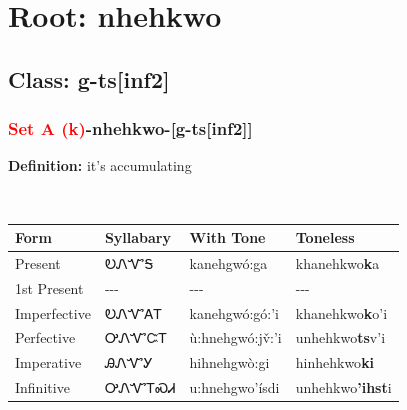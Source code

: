 \needspace{4in}
\section*{Root: nhehkwo}
\nopagebreak
{}
\needspace{3in}
\subsection*{Class: g-ts[inf2]}
\nopagebreak
\needspace{2in}
\subsubsection*{\textcolor{Red}{Set A (k)}{-}\textbf{nhehkwo}{-}[g-ts[inf2]]}
\nopagebreak
\textbf{Definition: } it{\textquoteright}s accumulating
\\[0.5em]
\begin{tabularx}{\textwidth}{l X X X}%
\toprule%
\textbf{Form}&\textbf{Syllabary}&\textbf{With Tone}&\textbf{Toneless}\\%
\midrule%
Present&ᎧᏁᏉᎦ&kanehgwó:ga&khanehkwo\textbf{k}a\\%
1st Present&{-}{-}{-}&{-}{-}{-}&{-}{-}{-}\\%
Imperfective&ᎧᏁᏉᎪᎢ&kanehgwó:gó:’i&khanehkwo\textbf{k}o'i\\%
Perfective&ᎤᏁᏉᏨᎢ&ù:hnehgwó:jv̌:’i&unhehkwo\textbf{ts}v'i\\%
Imperative&ᎯᏁᏉᎩ&hihnehgwò:gi&hinhehkwo\textbf{ki}\\%
Infinitive&ᎤᏁᏉᎢᏍᏗ&u:hnehgwo’ísdi&unhehkwo\textbf{'ihst}i\\%
\bottomrule%
\end{tabularx}
\\[1em]